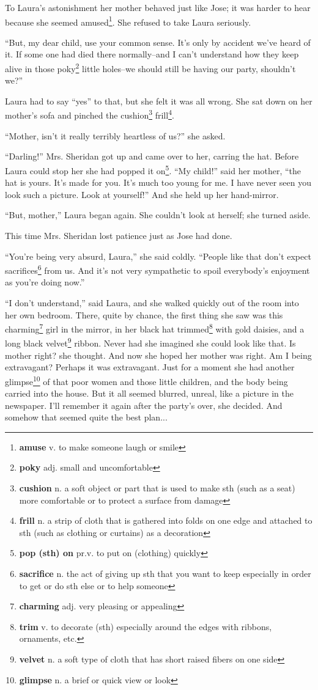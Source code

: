 To Laura's astonishment her mother behaved just like Jose; it was harder to hear because she seemed amused\footnote{\textbf{amuse} v. to make someone laugh or smile}. She refused to take Laura seriously.

``But, my dear child, use your common sense. It's only by accident we've heard of it. If some one had died there normally--and I can't understand how they keep alive in those poky\footnote{\textbf{poky} adj. small and uncomfortable} little holes--we should still be having our party, shouldn't we?''

Laura had to say ``yes'' to that, but she felt it was all wrong. She sat down on her mother's sofa and pinched the cushion\footnote{\textbf{cushion} n. a soft object or part that is used to make sth (such as a seat) more comfortable or to protect a surface from damage} frill\footnote{\textbf{frill} n. a strip of cloth that is gathered into folds on one edge and attached to sth (such as clothing or curtains) as a decoration}.

``Mother, isn't it really terribly heartless of us?'' she asked.

``Darling!'' Mrs. Sheridan got up and came over to her, carring the hat. Before Laura could stop her she had popped it on\footnote{\textbf{pop (sth) on} pr.v. to put on (clothing) quickly}. ``My child!'' said her mother, ``the hat is yours. It's made for you. It's much too young for me. I have never seen you look such a picture. Look at yourself!'' And she held up her hand-mirror.

``But, mother,'' Laura began again. She couldn't look at herself; she turned aside.

This time Mrs. Sheridan lost patience just as Jose had done.

``You're being very absurd, Laura,'' she said coldly. ``People like that don't expect sacrifices\footnote{\textbf{sacrifice} n. the act of giving up sth that you want to keep especially in order to get or do sth else or to help someone} from us. And it's not very sympathetic to spoil everybody's enjoyment as you're doing now.''

``I don't understand,'' said Laura, and she walked quickly out of the room into her own bedroom. There, quite by chance, the first thing she saw was this charming\footnote{\textbf{charming} adj. very pleasing or appealing} girl in the mirror, in her black hat trimmed\footnote{\textbf{trim} v. to decorate (sth) especially around the edges with ribbons, ornaments, etc.} with gold daisies, and a long black velvet\footnote{\textbf{velvet} n. a soft type of cloth that has short raised fibers on one side} ribbon. Never had she imagined she could look like that. Is mother right? she thought. And now she hoped her mother was right. Am I being extravagant? Perhaps it was extravagant. Just for a moment she had another glimpse\footnote{\textbf{glimpse} n. a brief or quick view or look} of that poor women and those little children, and the body being carried into the house. But it all seemed blurred, unreal, like a picture in the newspaper. I'll remember it again after the party's over, she decided. And somehow that seemed quite the best plan...


